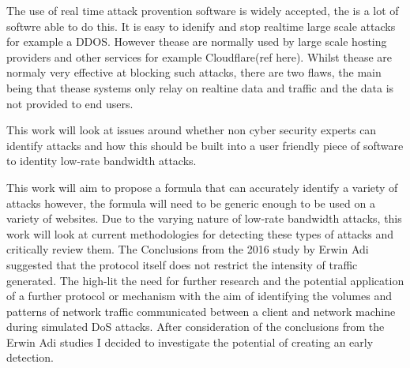 
The use of real time attack provention software is widely accepted, the is a lot of softwre able to do this. It is easy to idenify and stop realtime large scale attacks for example a DDOS. However thease are normally used by large scale hosting providers and other services for example Cloudflare(ref here). Whilst thease are normaly very effective at blocking such attacks, there are two flaws, the main being that thease systems only relay on realtine data and traffic and the data is not provided to end users.

This work will look at issues around whether non cyber security experts can identify attacks and how this should be built into a user friendly piece of software to identity low-rate bandwidth attacks.

This work will aim to propose a formula that can accurately identify a variety of attacks however, the formula will need to be generic enough to be used on a variety of websites. Due to the varying nature of low-rate bandwidth attacks, this work will look at current methodologies for detecting these types of attacks and critically review them.
The Conclusions from the 2016 study by Erwin Adi suggested that the protocol itself does not restrict the intensity of traffic generated. The high-lit the need for further research and the potential application of a further protocol or mechanism with the aim of identifying the volumes and patterns of network traffic communicated between a client and network machine during simulated DoS attacks. After consideration of the conclusions from the Erwin Adi studies I decided to investigate the potential of creating an early detection.
